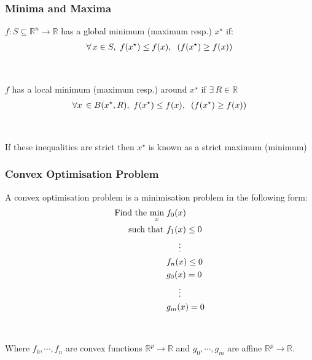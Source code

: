 \documentclass{beamer}
\def\rnum{\mathbb{R}}
\begin{document}
\begin{frame}
    \frametitle{Minima and Maxima}
    $f: S \subseteq \rnum^{n} \rightarrow \rnum$ has a global minimum (maximum
    resp.) $x^{\star}$ if:
    \begin{align*}
        \forall \, x \in S, \, \, f(x^{\star}) \leq f(x), \hspace{2mm}  (f(x^{\star}) \geq f(x))
    \end{align*}
    \\~\\
    $f$ has a local minimum (maximum resp.) around $x^{\star}$ if $\exists \, R \in
     \rnum$ 
    \begin{align*}
        \forall x \, \in B(x^{\star}, R), \, \, f(x^{\star}) \leq f(x),
        \hspace{2mm} (f(x^{\star}) \geq f(x))
    \end{align*}
    \\~\\
    If these inequalities are strict then $x^{\star}$ is known as a strict
    maximum (minimum)
\end{frame}

\begin{frame}
    \frametitle{Convex Optimisation Problem}
    A convex optimisation problem is a minimisation problem in the following
    form:
    {\footnotesize
    \begin{align*}
        \text{Find the }\underset{x}{\text{min}}\; &f_{0}(x) \\
        \text{  such that }&f_{1}(x) \leq 0 \\
        & \hspace{5mm} \vdots \\
        &f_{n}(x) \leq 0 \\
        &g_{0}(x) = 0 \\
        &\hspace{5mm} \vdots \\
        &g_{m}(x) = 0
    \end{align*}}
    \\~\\
    Where $f_0,\cdots, f_n$ are convex functions $\rnum^{p} \rightarrow \rnum$ and $g_0, \cdots, g_m$ are
    affine $\rnum^{p} \rightarrow \rnum$.
\end{frame}
\end{document}
